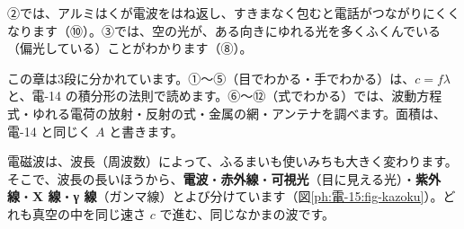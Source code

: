 \noindent ②では、アルミはくが電波をはね返し、すきまなく包むと電話がつながりにくくなります（⑩）。③では、空の光が、ある向きにゆれる光を多くふくんでいる（偏光している）ことがわかります（⑧）。

\begin{omoidasou}
\end{omoidasou}

\noindent この章は3段に分かれています。①〜⑤（目でわかる・手でわかる）は、$c=f\lambda$ と、電-14 の積分形の法則で読めます。⑥〜⑫（式でわかる）では、波動方程式・ゆれる電荷の放射・反射の式・金属の網・アンテナを調べます。面積は、電-14 と同じく $A$ と書きます。




\leavevmode\label{ph:電-15:sec1}電磁波は、波長（周波数）によって、ふるまいも使いみちも大きく変わります。そこで、波長の長いほうから、\textbf{電波}・\textbf{赤外線}・\textbf{可視光}（目に見える光）・\textbf{紫外線}・\textbf{X 線}・\textbf{γ 線}（ガンマ線）とよび分けています（図\ref{ph:電-15:fig-kazoku}）。どれも真空の中を同じ速さ $c$ で進む、同じなかまの波です。

